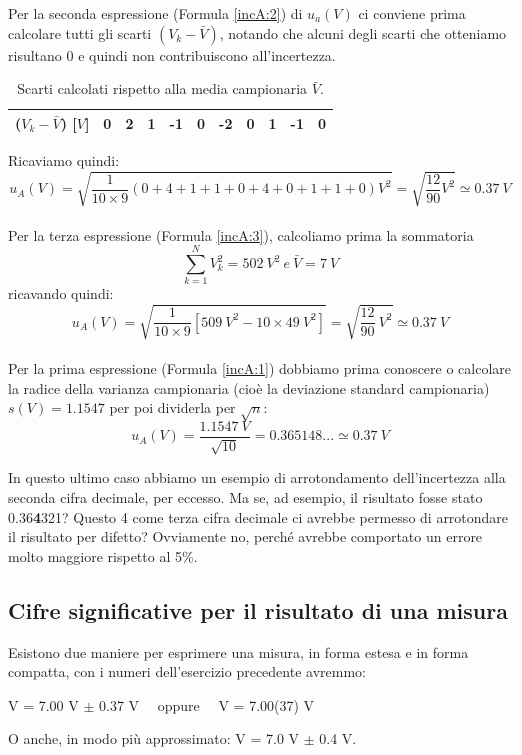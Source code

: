 \documentclass[a4paper,11pt]{report}
\begin{document}
Per la seconda espressione (Formula \ref{incA:2}) di $u_a(V)$ ci conviene prima calcolare tutti gli scarti $(V_k-\bar{V})$, notando che alcuni degli scarti che otteniamo risultano 0 e quindi non contribuiscono all'incertezza\footnotemark[1].
\begin{table}[H]
  \caption{Scarti calcolati rispetto alla media campionaria $\bar{V}$.}
  \label{tab:esIncertezza:scarti}

  \begin{center}
    \begin{tabular}{|l|c|r|r|r|r|r|r|r|r|r|}
    \hline
       ($V_k-\bar{V}$) [$V$]   & 0& 2& 1& -1& 0& -2& 0& 1& -1& 0 \\
    \hline
    \end{tabular}
  \end{center}
\end{table}
Ricaviamo quindi:
$$
  u_A(V) = \sqrt{\frac{1}{10\times 9}(0+4+1+1+0+4+0+1+1+0)V^2} = \sqrt{\frac{12}{90}V^2} \simeq 0.37\ V
$$
\\
Per la terza espressione (Formula \ref{incA:3}), calcoliamo prima la sommatoria
$$
  \sum^N_{k=1}V^2_k = 502\ V^2\ e\ \bar{V} = 7\ V
$$
ricavando quindi:
$$
  u_A(V) = \sqrt{\frac{1}{10\times 9}[509\ V^2 - 10 \times 49\ V^2]} = \sqrt{\frac{12}{90}\ V^2} \simeq 0.37\ V
$$
\\
Per la prima espressione (Formula \ref{incA:1}) dobbiamo prima conoscere o calcolare la radice della varianza campionaria (cioè la deviazione standard campionaria) $s(V) = 1.1547$ per poi dividerla per $\sqrt{n}$:
$$
  u_A(V) = \frac{1.1547\ V}{\sqrt{10}} = 0.365148... \simeq 0.37\ V
$$

In questo ultimo caso abbiamo un esempio di arrotondamento dell'incertezza alla seconda cifra decimale, per eccesso. Ma se, ad esempio, il risultato fosse stato 0.36\textbf{4}321? Questo 4 come terza cifra decimale ci avrebbe permesso di arrotondare il risultato per difetto? Ovviamente no, perché avrebbe comportato un errore molto maggiore rispetto al 5\%.
\subsection{Cifre significative per il risultato di una misura}
Esistono due maniere per esprimere una misura, in forma estesa e in forma compatta, con i numeri dell'esercizio precedente avremmo:
\begin{center}
  V = 7.00 V $\pm$ 0.37 V~~ oppure~~ V = 7.00(37) V    
\end{center}
O anche, in modo più approssimato: V = 7.0 V $\pm$ 0.4 V.
\end{document}
